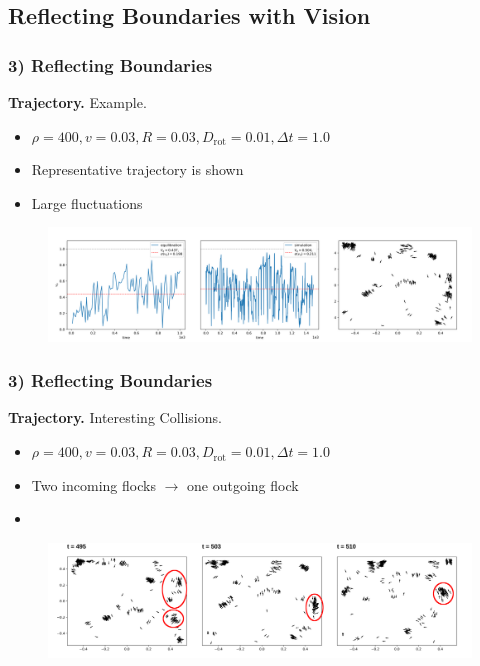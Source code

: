 \subsection{Reflecting Boundaries with Vision}

\begin{frame}
	\frametitle{3) Reflecting Boundaries}
	\textbf{Trajectory.} Example.
	\begin{itemize}
	    \item $\rho = 400, v = 0.03, R = 0.03, D_{\text{rot}} = 0.01, \Delta t = 1.0$
	    \item Representative trajectory is shown
	    \item Large fluctuations
	\end{itemize}
	\begin{figure}[H]
  		\includegraphics[width=\textwidth]{images/chapter3/flocks_N_20_L_1.000000_v_0.030000_R_0.010000_D_0.010000.png} 
	\end{figure}
\end{frame}

\begin{frame}
	\frametitle{3) Reflecting Boundaries}
	\textbf{Trajectory.} Interesting Collisions.
	\begin{itemize}
	    \item $\rho = 400, v = 0.03,  R = 0.03, D_{\text{rot}} = 0.01, \Delta t = 1.0$
	    \item Two incoming flocks $\rightarrow$ one outgoing flock 
	    \item 
	\end{itemize}
	\begin{figure}[H]
  		\includegraphics[width=\textwidth]{images/chapter3/collision_N_20_L_1.000000_v_0.030000_R_0.030000_D_0.010000.png} 
	\end{figure}
\end{frame}

